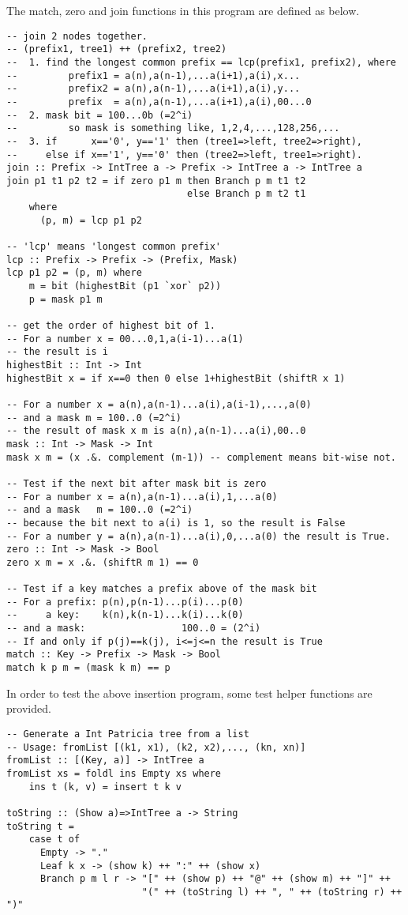 \documentclass{article}
\begin{document}
The match, zero and join functions in this program are defined as below.
\begin{lstlisting}
-- join 2 nodes together.
-- (prefix1, tree1) ++ (prefix2, tree2)
--  1. find the longest common prefix == lcp(prefix1, prefix2), where
--         prefix1 = a(n),a(n-1),...a(i+1),a(i),x...
--         prefix2 = a(n),a(n-1),...a(i+1),a(i),y...
--         prefix  = a(n),a(n-1),...a(i+1),a(i),00...0
--  2. mask bit = 100...0b (=2^i)
--         so mask is something like, 1,2,4,...,128,256,...
--  3. if      x=='0', y=='1' then (tree1=>left, tree2=>right), 
--     else if x=='1', y=='0' then (tree2=>left, tree1=>right).
join :: Prefix -> IntTree a -> Prefix -> IntTree a -> IntTree a
join p1 t1 p2 t2 = if zero p1 m then Branch p m t1 t2
                                else Branch p m t2 t1 
    where
      (p, m) = lcp p1 p2

-- 'lcp' means 'longest common prefix'
lcp :: Prefix -> Prefix -> (Prefix, Mask)
lcp p1 p2 = (p, m) where
    m = bit (highestBit (p1 `xor` p2))
    p = mask p1 m

-- get the order of highest bit of 1.
-- For a number x = 00...0,1,a(i-1)...a(1)
-- the result is i
highestBit :: Int -> Int
highestBit x = if x==0 then 0 else 1+highestBit (shiftR x 1)

-- For a number x = a(n),a(n-1)...a(i),a(i-1),...,a(0)
-- and a mask m = 100..0 (=2^i)
-- the result of mask x m is a(n),a(n-1)...a(i),00..0
mask :: Int -> Mask -> Int
mask x m = (x .&. complement (m-1)) -- complement means bit-wise not.

-- Test if the next bit after mask bit is zero
-- For a number x = a(n),a(n-1)...a(i),1,...a(0)
-- and a mask   m = 100..0 (=2^i)
-- because the bit next to a(i) is 1, so the result is False
-- For a number y = a(n),a(n-1)...a(i),0,...a(0) the result is True.
zero :: Int -> Mask -> Bool
zero x m = x .&. (shiftR m 1) == 0

-- Test if a key matches a prefix above of the mask bit
-- For a prefix: p(n),p(n-1)...p(i)...p(0)
--     a key:    k(n),k(n-1)...k(i)...k(0)
-- and a mask:                 100..0 = (2^i)
-- If and only if p(j)==k(j), i<=j<=n the result is True
match :: Key -> Prefix -> Mask -> Bool
match k p m = (mask k m) == p
\end{lstlisting}

In order to test the above insertion program, some test helper functions
are provided.

\begin{lstlisting}
-- Generate a Int Patricia tree from a list
-- Usage: fromList [(k1, x1), (k2, x2),..., (kn, xn)]
fromList :: [(Key, a)] -> IntTree a
fromList xs = foldl ins Empty xs where
    ins t (k, v) = insert t k v

toString :: (Show a)=>IntTree a -> String
toString t =
    case t of
      Empty -> "."
      Leaf k x -> (show k) ++ ":" ++ (show x)
      Branch p m l r -> "[" ++ (show p) ++ "@" ++ (show m) ++ "]" ++ 
                        "(" ++ (toString l) ++ ", " ++ (toString r) ++ ")"

\end{lstlisting}
\end{document}
